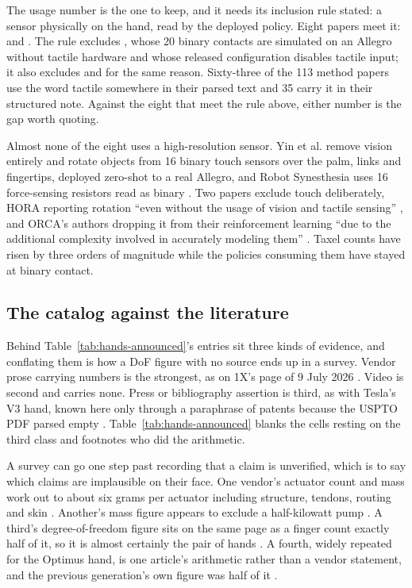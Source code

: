 The usage number is the one to keep, and it needs its inclusion rule stated: a sensor
physically on the hand, read by the deployed policy. Eight papers meet it:
\cite{anyrotate_2024,articulated_tools_inhand_2025,dexteleop0_2026,dexumi_2025,hato_visuotactile_2024,robot_synesthesia_2023,rotateit_2023}
and \cite{rotating_without_seeing_2023}. The rule excludes \cite{penspin_2024}, whose 20 binary
contacts are simulated on an Allegro without tactile hardware and whose released configuration
disables tactile input; it also excludes \cite{dexndm_2025} and \cite{dexplore_2025} for the
same reason. Sixty-three of the 113 method papers use the word tactile somewhere in their
parsed text and 35 carry it in their structured note. Against the eight that meet the rule
above, either number is the gap worth quoting.

Almost none of the eight uses a high-resolution sensor. Yin et al.
\cite{rotating_without_seeing_2023} remove vision entirely and rotate objects from 16 binary touch
sensors over the palm, links and fingertips, deployed zero-shot to a real Allegro, and Robot
Synesthesia uses 16 force-sensing resistors read as binary \cite{robot_synesthesia_2023}. Two
papers exclude touch deliberately, HORA reporting rotation ``even without the usage of vision and
tactile sensing'' \cite{hora_2022}, and ORCA's authors dropping it from their reinforcement
learning ``due to the additional complexity involved in accurately modeling them''
\cite{orca_hand_2025}. Taxel counts have risen by three orders of magnitude while the policies
consuming them have stayed at binary contact.

\subsection{The catalog against the literature}
\label{sec:hands:announced}

Behind Table~\ref{tab:hands-announced}'s entries sit three
kinds of evidence, and conflating them is how a DoF figure with no source ends up in a survey.
Vendor prose carrying numbers is the strongest, as on 1X's page of 9 July 2026
\cite{onex_neo_hand_2026}. Video is second and carries none. Press or bibliography assertion is
third, as with Tesla's V3 hand, known here only through a paraphrase of patents because the
USPTO PDF parsed empty \cite{tesla_optimus_hand_2025}. Table~\ref{tab:hands-announced} blanks
the cells resting on the third class and footnotes who did the arithmetic.

A survey can go one step past recording that a claim is unverified, which is to say which claims
are implausible on their face. One vendor's actuator count and mass work out to about six grams per
actuator including structure, tendons, routing and skin \cite{daxo_muscle_v0_2025}. Another's mass
figure appears to exclude a half-kilowatt pump \cite{clone_robotics_hand_2024}. A third's
degree-of-freedom figure sits on the same page as a finger count exactly half of it, so it is
almost certainly the pair of hands \cite{figure_03_hand_2025}. A fourth, widely repeated for the
Optimus hand, is one article's arithmetic rather than a vendor statement, and the previous
generation's own figure was half of it \cite{tesla_optimus_hand_2025}.

